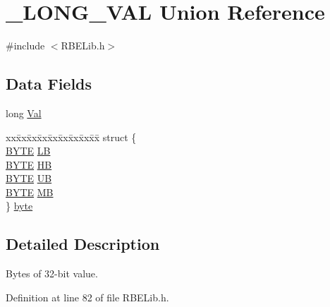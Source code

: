 \hypertarget{union___l_o_n_g___v_a_l}{\section{\+\_\+\+L\+O\+N\+G\+\_\+\+V\+A\+L Union Reference}
\label{union___l_o_n_g___v_a_l}
}


{\ttfamily \#include $<$R\+B\+E\+Lib.\+h$>$}

\subsection*{Data Fields}
\begin{DoxyCompactItemize}
\item 
long \hyperlink{union___l_o_n_g___v_a_l_a1e66ee294dc88fdfe6e8e11f21150542}{Val}
\item 
\begin{tabbing}
xx\=xx\=xx\=xx\=xx\=xx\=xx\=xx\=xx\=\kill
struct \{\\
\>\hyperlink{_r_b_e_lib_8h_aec93e83855ac17c3c25c55c37ca186dd}{BYTE} \hyperlink{union___l_o_n_g___v_a_l_a77e3b8990039140ed51ddff049575677}{LB}\\
\>\hyperlink{_r_b_e_lib_8h_aec93e83855ac17c3c25c55c37ca186dd}{BYTE} \hyperlink{union___l_o_n_g___v_a_l_a492ab3cb9e3bbe11a221ea77410a5f88}{HB}\\
\>\hyperlink{_r_b_e_lib_8h_aec93e83855ac17c3c25c55c37ca186dd}{BYTE} \hyperlink{union___l_o_n_g___v_a_l_a6eef702c6cc53b486d69105cb613fb1a}{UB}\\
\>\hyperlink{_r_b_e_lib_8h_aec93e83855ac17c3c25c55c37ca186dd}{BYTE} \hyperlink{union___l_o_n_g___v_a_l_a07a5aefc755b568368bb25d583b5c478}{MB}\\
\} \hyperlink{union___l_o_n_g___v_a_l_a1411f938ce42e7abc1f134b5e1cd3ae1}{byte}\\

\end{tabbing}\end{DoxyCompactItemize}


\subsection{Detailed Description}
Bytes of 32-\/bit value. 

Definition at line 82 of file R\+B\+E\+Lib.\+h.



